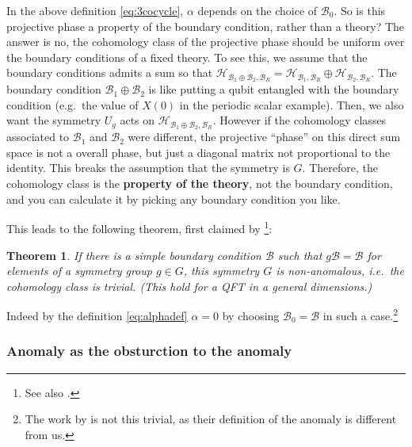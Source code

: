 \documentclass[
]{scrartcl}
\numberwithin{equation}{section}
\newtheorem{theorem}{Theorem}[section]
\theoremstyle{definition}
\theoremstyle{definition}
\theoremstyle{definition}
\theoremstyle{definition}
\theoremstyle{remark}
\begin{document}
In the above definition \eqref{eq:3cocycle}, \(\alpha\) depends on the choice of \(\mathcal{B}_0\). So is this projective phase a property of the boundary condition, rather than a theory?
The answer is no, the cohomology class of the projective phase should be uniform over the boundary conditions of a fixed theory.
To see this, we assume that the boundary conditions admits a sum so that \(\mathcal{H}_{\mathcal{B}_1\oplus \mathcal{B}_2,\mathcal{B}_R} = \mathcal{H}_{\mathcal{B}_1,\mathcal{B}_R} \oplus \mathcal{H}_{\mathcal{B}_2,\mathcal{B}_R}\).
The boundary condition \(\mathcal{B}_1\oplus \mathcal{B}_2\) is like
putting a qubit entangled with the boundary condition (e.g.~the value of \(X(0)\) in the periodic scalar example).
Then, we also want the symmetry \(U_g\) acts on \(\mathcal{H}_{\mathcal{B}_1\oplus \mathcal{B}_2,\mathcal{B}_R}\).
However if the cohomology classes associated to \(\mathcal{B}_1\) and \(\mathcal{B}_2\) were different, the projective ``phase'' on this direct sum space is not a overall phase, but just a diagonal matrix not proportional to the identity. This breaks the assumption that the symmetry is \(G\).
Therefore, the cohomology class is the \textbf{property of the theory}, not the boundary condition, and you can calculate it by picking any boundary condition you like.

This leads to the following theorem, first claimed by \textcite{Thorngren:2020yht} \footnote{See also \textcite{Hellerman:2021fla}.}:

\begin{theorem}
If there is a simple boundary condition \(\mathcal{B}\) such that \(g \mathcal{B} =\mathcal{B}\) for elements of a symmetry group \(g\in G\), this symmetry \(G\) is non-anomalous, i.e.~the cohomology class is trivial.
(This hold for a QFT in a general dimensions.)
\end{theorem}

Indeed by the definition \eqref{eq:alphadef} \(\alpha = 0\) by choosing \(\mathcal{B}_0 = \mathcal{B}\) in such a case.\footnote{The work by \textcite{Thorngren:2020yht} is not this trivial, as their definition of the anomaly is different from us.}

\hypertarget{anomaly-as-the-obsturction-to-the-anomaly}{%
\subsubsection{Anomaly as the obsturction to the anomaly}\label{anomaly-as-the-obsturction-to-the-anomaly}}
\end{document}
